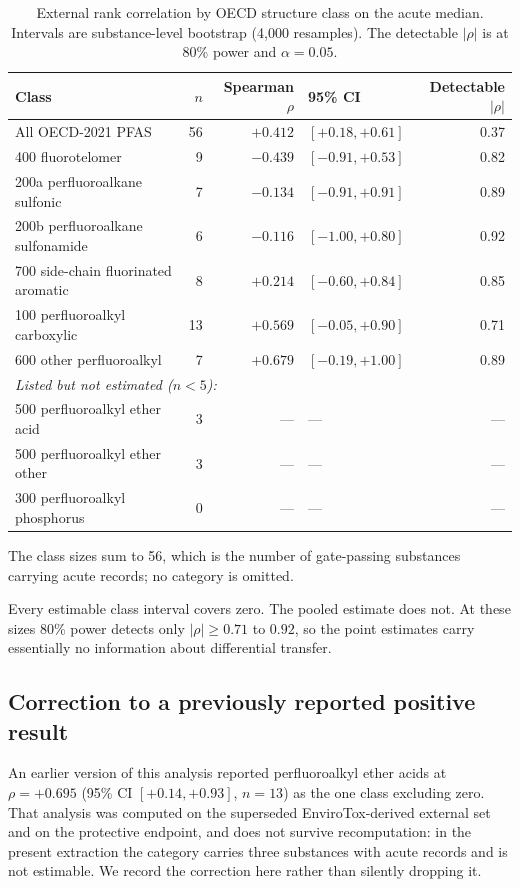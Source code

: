 \documentclass[11pt]{article}
\begin{document}
\begin{table}[h]
\centering
\caption{External rank correlation by OECD structure class on the acute median.
Intervals are substance-level bootstrap (4{,}000 resamples). The detectable
$|\rho|$ is at 80\% power and $\alpha=0.05$.}
\small
\begin{tabular}{lrrlr}
\toprule
Class & $n$ & Spearman $\rho$ & 95\% CI & Detectable $|\rho|$ \\
\midrule
All OECD-2021 PFAS & 56 & $+0.412$ & $[+0.18,+0.61]$ & 0.37 \\
\midrule
400 fluorotelomer & 9 & $-0.439$ & $[-0.91,+0.53]$ & 0.82 \\
200a perfluoroalkane sulfonic & 7 & $-0.134$ & $[-0.91,+0.91]$ & 0.89 \\
200b perfluoroalkane sulfonamide & 6 & $-0.116$ & $[-1.00,+0.80]$ & 0.92 \\
700 side-chain fluorinated aromatic & 8 & $+0.214$ & $[-0.60,+0.84]$ & 0.85 \\
100 perfluoroalkyl carboxylic & 13 & $+0.569$ & $[-0.05,+0.90]$ & 0.71 \\
600 other perfluoroalkyl & 7 & $+0.679$ & $[-0.19,+1.00]$ & 0.89 \\
\midrule
\multicolumn{5}{l}{\emph{Listed but not estimated ($n<5$):}} \\
500 perfluoroalkyl ether acid & 3 & --- & --- & --- \\
500 perfluoroalkyl ether other & 3 & --- & --- & --- \\
300 perfluoroalkyl phosphorus & 0 & --- & --- & --- \\
\bottomrule
\end{tabular}
\end{table}

The class sizes sum to 56, which is the number of gate-passing substances
carrying acute records; no category is omitted.

Every estimable class interval covers zero. The pooled estimate does not. At
these sizes 80\% power detects only $|\rho|\ge0.71$ to $0.92$, so the point
estimates carry essentially no information about differential transfer.

\subsection*{Correction to a previously reported positive result}

An earlier version of this analysis reported perfluoroalkyl ether acids at
$\rho=+0.695$ (95\% CI $[+0.14,+0.93]$, $n=13$) as the one class excluding zero.
That analysis was computed on the superseded EnviroTox-derived external set
and on the protective endpoint, and does not survive
recomputation: in the present extraction the category carries three substances
with acute records and is not estimable. We record the correction here rather
than silently dropping it.
\end{document}
